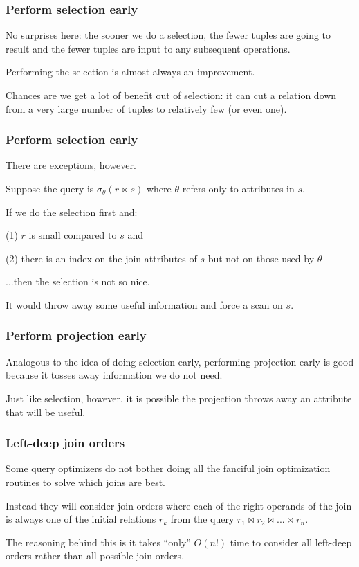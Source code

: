 \begin{frame}
\frametitle{Perform selection early}

No surprises here: the sooner we do a selection, the fewer tuples are going to result and the fewer tuples are input to any subsequent operations. 

Performing the selection is almost always an improvement. 

Chances are we get a lot of benefit out of selection: it can cut a relation down from a very large number of tuples to relatively few (or even one). 


\end{frame}

\begin{frame}
\frametitle{Perform selection early}

There are exceptions, however.

Suppose the query is $\sigma_{\theta}( r \bowtie s )$ where $\theta$ refers only to attributes in $s$. 

If we do the selection first and: 

(1) $r$ is small compared to $s$ and 

(2) there is an index on the join attributes of $s$ but not on those used by $\theta$ 

...then the selection is not so nice. 

It would throw away some useful information and force a scan on $s$.


\end{frame}

\begin{frame}
\frametitle{Perform projection early}

Analogous to the idea of doing selection early, performing projection early is good because it tosses away information we do not need.

Just like selection, however, it is possible the projection throws away an attribute that will be useful.


\end{frame}

\begin{frame}
\frametitle{Left-deep join orders}

Some query optimizers do not bother doing all the fanciful join optimization routines to solve which joins are best. 

Instead they will consider join orders where each of the right operands of the join is always one of the initial relations $r_{k}$ from the query $r_{1} \bowtie r_{2} \bowtie ... \bowtie r_{n}$. 

The reasoning behind this is it takes ``only'' $O(n!)$ time to consider all left-deep orders rather than all possible join orders.


\end{frame}


